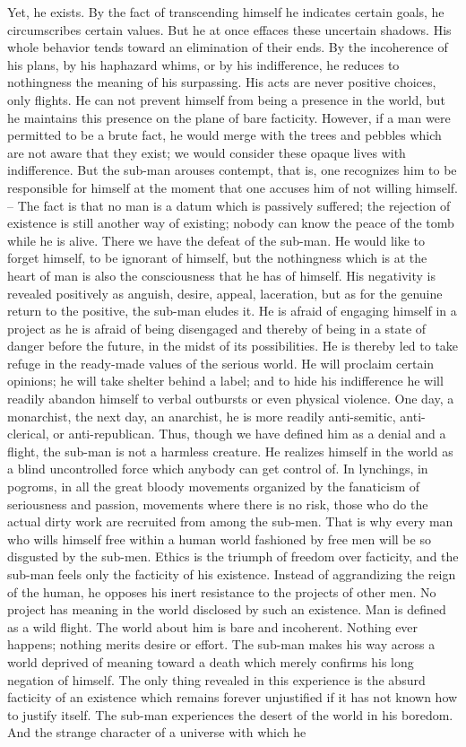 \documentclass[11pt]{article}
\begin{document}
Yet, he exists. By the fact of transcending himself he indicates certain goals, he circumscribes certain values. But he at once effaces these uncertain shadows. His whole behavior tends toward an elimination of their ends. By the incoherence of his plans, by his haphazard whims, or by his indifference, he reduces to nothingness the meaning of his surpassing. His acts are never positive choices, only flights. He can not prevent himself from being a presence in the world, but he maintains this presence on the plane of bare facticity. However, if a man were permitted to be a brute fact, he would merge with the trees and pebbles which are not aware that they exist; we would consider these opaque lives with indifference. But the sub-man arouses contempt, that is, one recognizes him to be responsible for himself at the moment that one accuses him of not willing himself. – The fact is that no man is a datum which is passively suffered; the rejection of existence is still another way of existing; nobody can know the peace of the tomb while he is alive. There we have the defeat of the sub-man. He would like to forget himself, to be ignorant of himself, but the nothingness which is at the heart of man is also the consciousness that he has of himself. His negativity is revealed positively as anguish, desire, appeal, laceration, but as for the genuine return to the positive, the sub-man eludes it. He is afraid of engaging himself in a project as he is afraid of being disengaged and thereby of being in a state of danger before the future, in the midst of its possibilities. He is thereby led to take refuge in the ready-made values of the serious world. He will proclaim certain opinions; he will take shelter behind a label; and to hide his indifference he will readily abandon himself to verbal outbursts or even physical violence. One day, a monarchist, the next day, an anarchist, he is more readily anti-semitic, anti-clerical, or anti-republican. Thus, though we have defined him as a denial and a flight, the sub-man is not a harmless creature. He realizes himself in the world as a blind uncontrolled force which anybody can get control of. In lynchings, in pogroms, in all the great bloody movements organized by the fanaticism of seriousness and passion, movements where there is no risk, those who do the actual dirty work are recruited from among the sub-men. That is why every man who wills himself free within a human world fashioned by free men will be so disgusted by the sub-men. Ethics is the triumph of freedom over facticity, and the sub-man feels only the facticity of his existence. Instead of aggrandizing the reign of the human, he opposes his inert resistance to the projects of other men. No project has meaning in the world disclosed by such an existence. Man is defined as a wild flight. The world about him is bare and incoherent. Nothing ever happens; nothing merits desire or effort. The sub-man makes his way across a world deprived of meaning toward a death which merely confirms his long negation of himself. The only thing revealed in this experience is the absurd facticity of an existence which remains forever unjustified if it has not known how to justify itself. The sub-man experiences the desert of the world in his boredom. And the strange character of a universe with which he 
\end{document}
